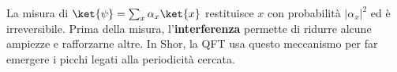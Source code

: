 \begin{onehalfspace}
La misura di $\ket{\psi}=\sum_x\alpha_x\ket{x}$ restituisce $x$ con probabilit\`a $|\alpha_x|^2$ ed \`e irreversibile. Prima della misura, l'\textbf{interferenza} permette di ridurre alcune ampiezze e rafforzarne altre. In Shor, la \ac{QFT} usa questo meccanismo per far emergere i picchi legati alla periodicit\`a cercata.

\end{onehalfspace}
